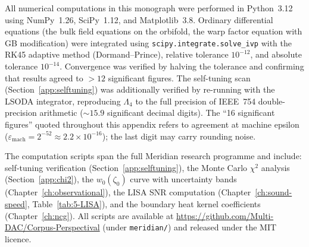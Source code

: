 All numerical computations in this monograph were performed in Python~3.12 using NumPy~1.26, SciPy~1.12, and Matplotlib~3.8. Ordinary differential equations (the bulk field equations on the orbifold, the warp factor equation with GB modification) were integrated using \texttt{scipy.integrate.solve\_ivp} with the RK45 adaptive method (Dormand--Prince), relative tolerance $10^{-12}$, and absolute tolerance $10^{-14}$. Convergence was verified by halving the tolerance and confirming that results agreed to $> 12$ significant figures. The self-tuning scan (Section~\ref{app:selftuning}) was additionally verified by re-running with the LSODA integrator, reproducing $\Lambda_4$ to the full precision of IEEE~754 double-precision arithmetic (${\sim}15.9$ significant decimal digits). The ``16 significant figures'' quoted throughout this appendix refers to agreement at machine epsilon ($\varepsilon_{\mathrm{mach}} = 2^{-52} \approx 2.2 \times 10^{-16}$); the last digit may carry rounding noise.

The computation scripts span the full Meridian research programme and include: self-tuning verification (Section~\ref{app:selftuning}), the Monte Carlo $\chi^2$ analysis (Section~\ref{app:chi2}), the $w_0(\zeta_0)$ curve with uncertainty bands (Chapter~\ref{ch:observational}), the LISA SNR computation (Chapter~\ref{ch:sound-speed}, Table~\ref{tab:5-LISA}), and the boundary heat kernel coefficients (Chapter~\ref{ch:ncg}). All scripts are available at \url{https://github.com/Multi-DAC/Corpus-Perspectival} (under \texttt{meridian/}) and released under the MIT licence.
